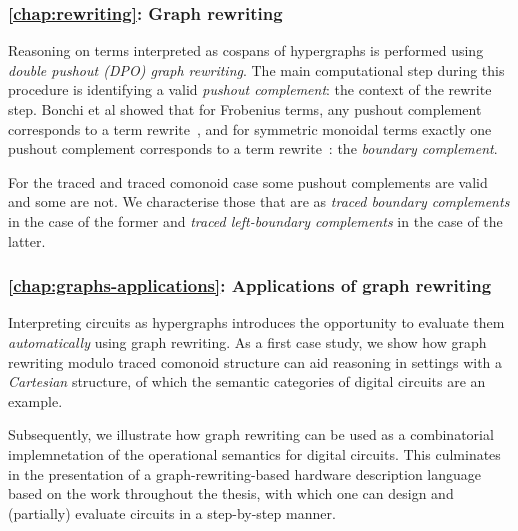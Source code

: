 \subsubsection{\cref{chap:rewriting}: Graph rewriting}

Reasoning on terms interpreted as cospans of hypergraphs is performed using
\emph{double pushout (DPO) graph rewriting}.
The main computational step during this procedure is identifying a valid
\emph{pushout complement}: the context of the rewrite step.
Bonchi et al showed that for Frobenius terms, any pushout complement corresponds
to a term rewrite~\cite{bonchi2022string}, and for symmetric monoidal terms
exactly one pushout complement corresponds to a term
rewrite~\cite{bonchi2022stringa}: the \emph{boundary complement}.

For the traced and traced comonoid case some pushout complements are valid and
some are not.
We characterise those that are as \emph{traced boundary complements} in the case
of the former and \emph{traced left-boundary complements} in the case of the
latter.

\subsubsection{\cref{chap:graphs-applications}: Applications of graph rewriting}

Interpreting circuits as hypergraphs introduces the opportunity to evaluate them
\emph{automatically} using graph rewriting.
As a first case study, we show how graph rewriting modulo traced comonoid
structure can aid reasoning in settings with a \emph{Cartesian} structure, of
which the semantic categories of digital circuits are an example.

Subsequently, we illustrate how graph rewriting can be used as a combinatorial
implemnetation of the operational semantics for digital circuits.
This culminates in the presentation of a graph-rewriting-based hardware
description language based on the work throughout the thesis, with which one can
design and (partially) evaluate circuits in a step-by-step manner.